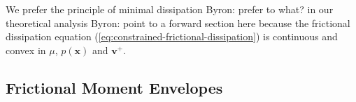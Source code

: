 \documentclass[conference]{IEEEtran}
\newtheorem{proposition}{Proposition}
\newcommand{\BB}[1]{{\color{red} {Byron: {#1}}}}
\begin{document}
We prefer the principle of minimal dissipation \BB{prefer to what?} in our theoretical
analysis \BB{point to a forward section here} because the frictional dissipation equation (\ref{eq:constrained-frictional-dissipation}) is continuous and
convex in $\mu$, $p(\mathbf{x})$ and $\mathbf{v}^+$.





\subsection{Frictional Moment Envelopes}\label{sec:frictional-envelope}
\end{document}
